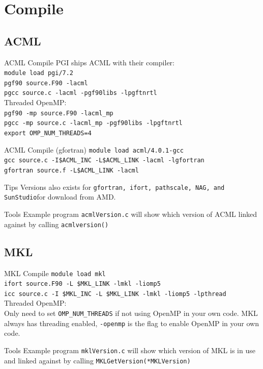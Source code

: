 \documentclass[handout]{beamer}
\begin{document}
\section{Compile}
\subsection{ACML}
\begin{frame}{ACML Compile}
PGI ships ACML with their compiler: \\
\texttt{module load pgi/7.2}        \\
\texttt{pgf90 source.F90 -lacml}    \\
\texttt{pgcc  source.c -lacml -pgf90libs -lpgftnrtl} \\
Threaded OpenMP:                    \\
\texttt{pgf90 -mp source.F90 -lacml\_mp}            \\
\texttt{pgcc  -mp source.c   -lacml\_mp -pgf90libs -lpgftnrtl} \\
\texttt{export OMP\_NUM\_THREADS=4}                 \\
\end{frame}
\begin{frame}{ACML Compile (gfortran)}
\texttt{module load acml/4.0.1-gcc}       \\
\texttt{gcc source.c -I\$ACML\_INC -L\$ACML\_LINK -lacml -lgfortran} \\
\texttt{gfortran source.f -L\$ACML\_LINK -lacml}  \\
\begin{block}{Tips}
Versions also exists for \texttt{gfortran, ifort, pathscale, NAG, and SunStudio}for download from AMD. 
\end{block}
\begin{block}{Tools}
Example program \texttt{acmlVersion.c} will show which version of ACML linked against by calling \texttt{acmlversion()}
\end{block}
\end{frame}

\subsection{MKL}
\begin{frame}{MKL Compile}
\texttt{module load mkl}            \\
\texttt{ifort source.F90 -L \$MKL\_LINK -lmkl -liomp5}      \\
\texttt{icc   source.c   -I \$MKL\_INC -L \$MKL\_LINK -lmkl -liomp5 -lpthread}  \\
Threaded OpenMP:                    \\
Only need to set \texttt{OMP\_NUM\_THREADS} if not using OpenMP in your own code.  MKL always has threading enabled, \texttt{-openmp} is the flag to enable OpenMP in your own code.
\begin{block}{Tools}
Example program \texttt{mklVersion.c} will show which version of MKL is in use and linked against by calling \texttt{MKLGetVersion(*MKLVersion)} \\
\end{block}
\end{frame}
\end{document}
